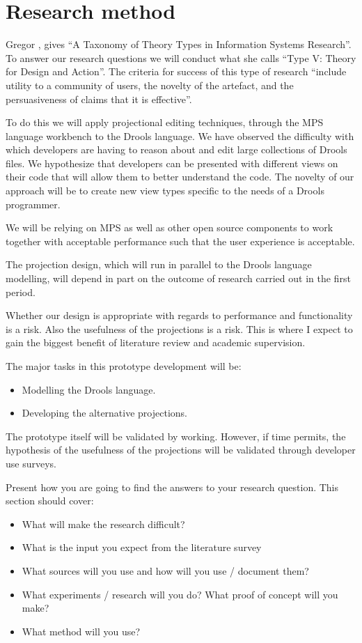 \section{Research method} 

Gregor \cite{gregor2006nature}, gives “A Taxonomy of Theory Types in Information Systems Research”. 
To answer our research questions we will conduct what she calls “Type V: Theory for Design and Action”. 
The criteria for success of this type of research “include utility to a community of users, the novelty of the artefact, and the persuasiveness of claims that it is effective”.

To do this we will apply projectional editing techniques, through the MPS language workbench to the Drools language.
We have observed the difficulty with which developers are having to reason about and edit large collections of Drools files.
We hypothesize that developers can be presented with different views on their code that will allow them to better understand the code.
The novelty of our approach will be to create new view types specific to the needs of a Drools programmer.

We will be relying on MPS as well as other open source components to work together with acceptable performance such that the user experience is acceptable.

The projection design, which will run in parallel to the Drools language modelling, will depend in part on the outcome of research carried out in the first period.

Whether our design is appropriate with regards to performance and functionality is a risk. 
Also the usefulness of the projections is a risk.
This is where I expect to gain the biggest benefit of literature review and academic supervision. 

The major tasks in this prototype development will be: 
\begin{itemize}
    \item Modelling the Drools language.
    \item Developing the alternative projections.
\end{itemize}

The prototype itself will be validated by working.
However, if time permits, the hypothesis of the usefulness of the projections will be validated through developer use surveys.


Present how you are going to find the answers to your research question. This section should cover:
\begin{itemize}
    \item What will make the research difficult?
    \item What is the input you expect from the literature survey
    \item What sources will you use and how will you use / document them?
    \item What experiments / research will you do? What proof of concept will you make?
	\item What method will you use?
\end{itemize}